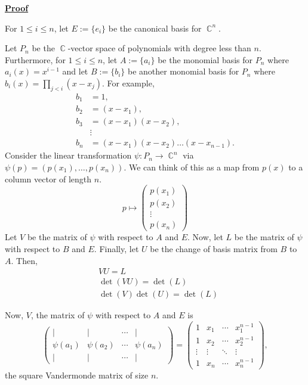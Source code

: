 \documentclass[a4paper, 11pt]{book}
\newcommand{\proof}{\underline{\textbf{Proof}} }
\DeclareMathOperator{\C}{\mathbb{C}}
\begin{document}
\proof{For $1 \leq i \leq n$, let $E := {\{e_i\}}$ be the canonical basis for ${\C}^{n}$.\par

    Let $P_n$ be the $\C$-vector space of polynomials with degree less than $n$. Furthermore, for $1 \leq i \leq n$, let $A := \{a_i\}$ be the monomial basis for $P_n$ where $a_i(x) = x^{i-1}$ and let $B := \{b_i\}$ be another monomial basis for $P_n$ where $b_i(x) = \prod\limits_{j < i} (x-x_j)$. For example, 
\begin{align*}
    b_1 &= 1, \\ 
    b_2 &= (x - x_1), \\ 
    b_3 &= (x - x_1)(x - x_2), \\
        &\vdots \\
    b_n &= (x - x_1)(x - x_2) \ldots (x - x_{n-1}).
\end{align*}
Consider the linear transformation $\psi : P_n \to \C^n$ via $\psi(p) = (p(x_1), \ldots, p(x_n))$. We can think of this as a map from $p(x)$ to a column vector of length $n$. 
\[
    p \mapsto 
    \begin{pmatrix}
        p(x_1) \\
        p(x_2) \\
        \vdots \\
        p(x_n)
    \end{pmatrix}
\]
Let $V$ be the matrix of $\psi$ with respect to $A$ and $E$. Now, let $L$ be the matrix of $\psi$ with respect to $B$ and $E$. Finally, let $U$ be the change of basis matrix from $B$ to $A$. Then, 
\begin{align*}
    &VU = L \\
    &\det(VU) = \det(L) \\
    &\det(V)\det(U) = \det(L)
\end{align*}

Now, $V$, the matrix of $\psi$ with respect to $A$ and $E$ is  
\[\begin{pmatrix}
    \vert & \vert &\cdots & \vert \\
    \psi(a_1) & \psi(a_2) &\cdots & \psi(a_n) \\
    \vert & \vert &\cdots & \vert
\end{pmatrix} = 
\begin{pmatrix}
    1 & x_1 & \cdots & x_1^{n-1} \\
    1 & x_2 & \cdots & x_2^{n-1} \\
    \vdots & \vdots & \ddots & \vdots \\
    1 & x_n & \cdots & x_n^{n-1}
\end{pmatrix},\] 
the square Vandermonde matrix of size $n$.\par

}
\end{document}
